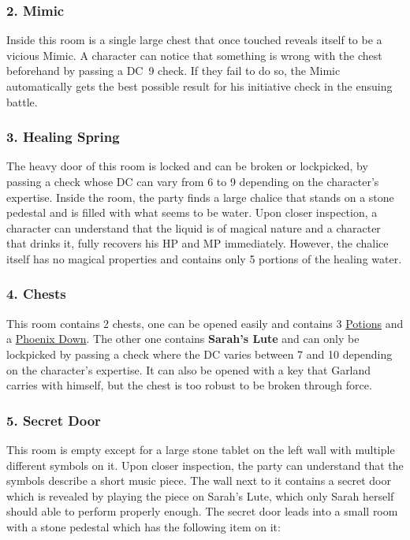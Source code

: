 \subsubsection*{2. Mimic}
Inside this room is a single large chest that once touched reveals itself to be a vicious Mimic.
A character can notice that something is wrong with the chest beforehand by passing a DC~9 check.
If they fail to do so, the Mimic automatically gets the best possible result for his initiative check in the ensuing battle.
\vfill


\subsubsection*{3. Healing Spring}
The heavy door of this room is locked and can be broken or lockpicked, by passing a check whose DC can vary from 6 to 9 depending on the character's expertise.
Inside the room, the party finds a large chalice that stands on a stone pedestal and is filled with what seems to be water.
Upon closer inspection, a character can understand that the liquid is of magical nature and a character that drinks it, fully recovers his HP and MP immediately.
However, the chalice itself has no magical properties and contains only 5 portions of the healing water.

\subsubsection*{4. Chests}
This room contains 2 chests, one can be opened easily and contains 3 \hyperlink{item}{Potions} and a \hyperlink{item}{Phoenix Down}.
The other one contains \textbf{Sarah's Lute} and can only be lockpicked by passing a check where the DC varies between 7 and 10 depending on the character's expertise.
It can also be opened with a key that Garland carries with himself, but the chest is too robust to be broken through force.

\subsubsection*{5. Secret Door}
This room is empty except for a large stone tablet on the left wall with multiple different symbols on it.
Upon closer inspection, the party can understand that the symbols describe a short music piece. 
The wall next to it contains a secret door which is revealed by playing the piece on Sarah's Lute, which only Sarah herself should able to perform properly enough.
The secret door leads into a small room with a stone pedestal which has the following item on it:  
\vspace{0.3cm}
